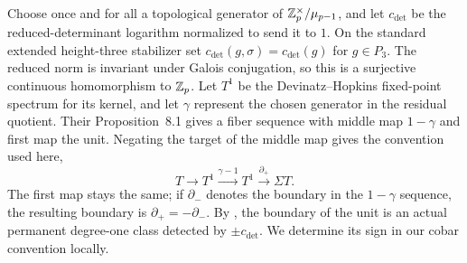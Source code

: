 Choose once and for all a topological generator of
\(\mathbb Z_p^\times/\mu_{p-1}\), and let \(c_{\mathrm{det}}\) be the reduced-determinant
logarithm normalized to send it to \(1\).  On the standard extended
height-three stabilizer set \(c_{\mathrm{det}}(g,\sigma)=c_{\mathrm{det}}(g)\) for \(g\in P_3\).
The reduced norm is invariant under Galois conjugation, so this is a
surjective continuous homomorphism to \(\mathbb Z_p\).  Let \(T^1\) be the
Devinatz--Hopkins fixed-point spectrum for its kernel, and let
\(\gamma\) represent the chosen generator in the residual quotient.
Their Proposition~8.1 gives a fiber sequence with middle map
\(1-\gamma\) and first map the unit.  Negating the target of the middle
map gives the convention used here,
\[
 T\longrightarrow T^1\xrightarrow{\gamma-1}T^1
       \xrightarrow{\partial_+}\Sigma T.
\]
The first map stays the same; if \(\partial_-\) denotes the boundary in
the \(1-\gamma\) sequence, the resulting boundary is
\(\partial_+=-\partial_-\).  By
\cite[Theorem~6 and Propositions~8.1--8.2]{DevinatzHopkins}, the boundary
of the unit is an actual permanent degree-one class detected by
\(\pm c_{\mathrm{det}}\).  We determine its sign in our cobar convention locally.

